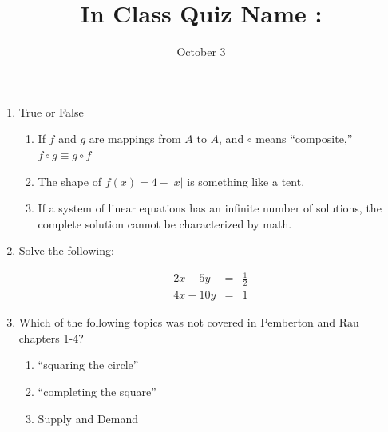 \documentclass[11pt]{article}
\begin{document}
\title{In Class Quiz \hfill Name : \underline{\hspace{3cm}}}
\date{October 3}
\maketitle
\begin{enumerate}
\item True or False
\begin{enumerate}
\item If $f$ and $g$ are mappings from $A$ to $A$, and $\circ$ means ``composite,'' $f\circ g\equiv g\circ f$
\item The shape of $f(x)=4-|x|$ is something like a tent.
\item If a system of linear equations has an infinite number of solutions, the complete solution cannot be characterized by math.

\end{enumerate}


\item Solve the following:

\begin{eqnarray*}
2x-5y&=&\frac{1}{2}\\
4x-10y&=&1
\end{eqnarray*}


\item Which of the following topics was not covered in Pemberton and Rau chapters 1-4?
\begin{enumerate}
\item ``squaring the circle''
\item ``completing the square''
\item Supply and Demand
\end{enumerate}
\end{enumerate}
\end{document}
